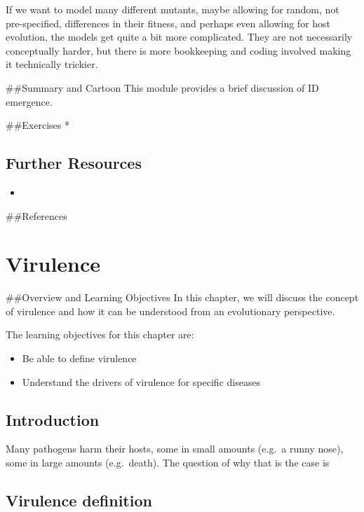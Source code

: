 \documentclass[]{book}
\providecommand{\tightlist}{%
  \setlength{\itemsep}{0pt}\setlength{\parskip}{0pt}}
\theoremstyle{definition}
\theoremstyle{definition}
\theoremstyle{definition}
\theoremstyle{remark}
\begin{document}
If we want to model many different mutants, maybe allowing for random,
not pre-specified, differences in their fitness, and perhaps even
allowing for host evolution, the models get quite a bit more
complicated. They are not necessarily conceptually harder, but there is
more bookkeeping and coding involved making it technically trickier.

\#\#Summary and Cartoon This module provides a brief discussion of ID
emergence.

\#\#Exercises *

\hypertarget{further-resources-9}{%
\section{Further Resources}\label{further-resources-9}}

\begin{itemize}
\item
\end{itemize}

\#\#References

\hypertarget{virulence}{%
\chapter{Virulence}\label{virulence}}

\#\#Overview and Learning Objectives In this chapter, we will discuss
the concept of virulence and how it can be understood from an
evolutionary perspective.

The learning objectives for this chapter are:

\begin{itemize}
\tightlist
\item
  Be able to define virulence
\item
  Understand the drivers of virulence for specific diseases
\end{itemize}

\hypertarget{introduction-10}{%
\section{Introduction}\label{introduction-10}}

Many pathogens harm their hosts, some in small amounts (e.g.~a runny
nose), some in large amounts (e.g.~death). The question of why that is
the case is

\hypertarget{virulence-definition}{%
\section{Virulence definition}\label{virulence-definition}}
\end{document}
